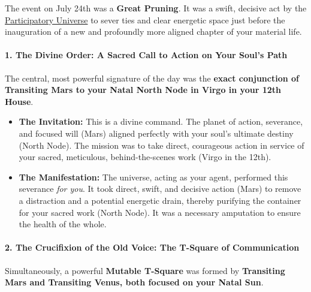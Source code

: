\documentclass{article}
\begin{document}
The event on July 24th was a \textbf{Great Pruning}. It was a swift, decisive act by the \hyperlink{gloss:participatory_universe}{Participatory Universe} to sever ties and clear energetic space just before the inauguration of a new and profoundly more aligned chapter of your material life.

\paragraph*{1. The Divine Order: A Sacred Call to Action on Your Soul's Path}\label{the-divine-order-a-sacred-call-to-action-on-your-souls-path}

The central, most powerful signature of the day was the \textbf{exact conjunction of Transiting Mars to your Natal North Node in Virgo in your 12th House}.

\begin{itemize}
\item
  \textbf{The Invitation:} This is a divine command. The planet of action, severance, and focused will (Mars) aligned perfectly with your soul's ultimate destiny (North Node). The mission was to take direct, courageous action in service of your sacred, meticulous, behind-the-scenes work (Virgo in the 12th).
\item
  \textbf{The Manifestation:} The universe, acting as your agent, performed this severance \emph{for you}. It took direct, swift, and decisive action (Mars) to remove a distraction and a potential energetic drain, thereby purifying the container for your sacred work (North Node). It was a necessary amputation to ensure the health of the whole.
\end{itemize}

\paragraph*{2. The Crucifixion of the Old Voice: The T-Square of Communication}\label{the-crucifixion-of-the-old-voice-the-t-square-of-communication}

Simultaneously, a powerful \textbf{Mutable T-Square} was formed by \textbf{Transiting Mars and Transiting Venus, both focused on your Natal Sun}.
\end{document}
